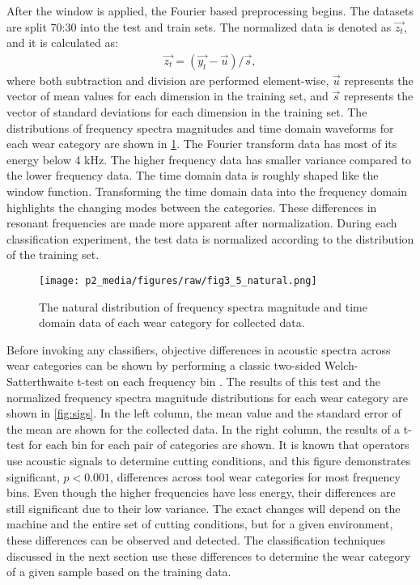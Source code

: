 After the window is applied, the Fourier based preprocessing begins.
The datasets are split 70:30 into the test and train sets. 
The normalized data is denoted as $\vec{z_t}$, and it is calculated as:
\begin{align}
\vec{z_t} = (\vec{y_t} - \vec{u}) / \vec{s},
\end{align}
where both subtraction and division are performed element-wise, $\vec{u}$ represents the vector
of mean values for each dimension in the training set, 
and $\vec{s}$ represents the vector of standard deviations for each
dimension in the training set. 
The distributions of frequency spectra magnitudes and time domain waveforms
for each wear category are shown in \ref{fig:natural}.
The Fourier transform data has most of its energy below 4 kHz.
The higher frequency data has smaller variance compared to the
lower frequency data.
The time domain data is roughly shaped like the window function.
Transforming the time domain data into the frequency domain highlights
the changing modes between the categories.
These differences in resonant frequencies are made more apparent after normalization.
During each classification experiment, 
the test data is normalized according to the distribution of the training set.

\begin{figure}[t!]
\centering
\texttt{[image: p2\_media/figures/raw/fig3\_5\_natural.png]}
\caption{
The natural distribution of frequency spectra magnitude 
and time domain data of each wear category for collected data.
}
\label{fig:natural}
\end{figure}

Before invoking any classifiers, objective differences in acoustic spectra across wear 
categories can be shown by performing a classic two-sided Welch-Satterthwaite t-test on each frequency bin \cite{Tamhane2000}.
The results of this test and the normalized frequency spectra magnitude distributions
for each wear category are shown in \ref{fig:sigs}.
In the left column, the mean value and the standard error of the mean are shown for the collected data.
In the right column, the results of a t-test for each bin for each pair of categories are shown.
It is known that operators use acoustic signals to determine cutting conditions,
and this figure demonstrates significant, $p < 0.001$, differences across tool wear categories
for most frequency bins. Even though the higher frequencies have less energy, their differences
are still significant due to their low variance.
The exact changes will depend on the machine and the entire set of cutting conditions, but 
for a given environment, these differences can be observed and detected.
The classification techniques discussed in the next section use these differences to 
determine the wear category of a given sample based on the training data.

